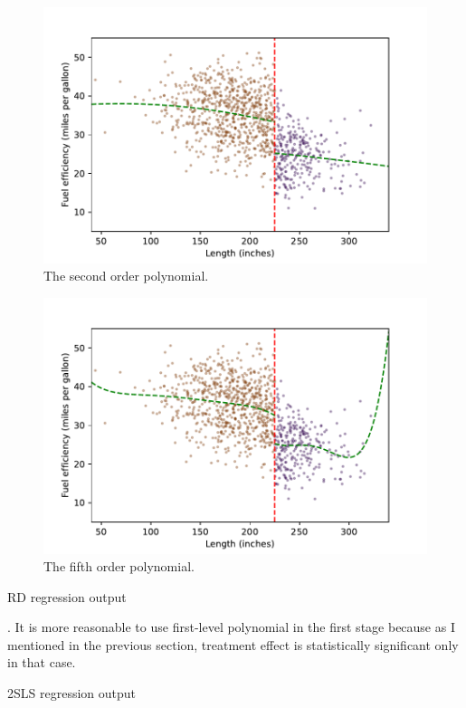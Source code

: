 \documentclass{article}
\begin{document}
\begin{figure}[h!]
    \centering
    \includegraphics{homework 7/output/figure/scatterplot3.pdf}
    \caption{The second order polynomial.}
    \label{fig:scatterplot3}
\end{figure}


\begin{figure}[h!]
    \centering
    \includegraphics{homework 7/output/figure/scatterplot5.pdf}
    \caption{The fifth order polynomial.}
    \label{fig:scatterplot5}
\end{figure}



\begin{table}[h]
    \centering
    
    \caption{RD regression output}
    \label{tab:RD}
\end{table}
\clearpage

. It is more reasonable to use first-level polynomial in the first stage because as I mentioned in the previous section, treatment effect is statistically significant only in that case. 
\begin{table}[h]
    \centering
    
    \caption{2SLS regression output}
    \label{tab:2SLSRD}
\end{table}
\end{document}
